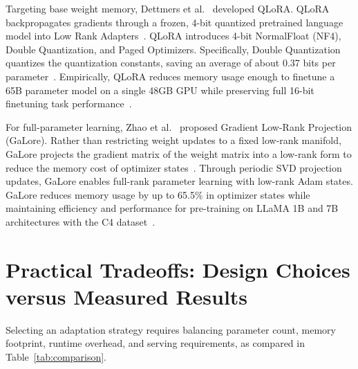 \documentclass[11pt,a4paper]{article}
\begin{document}
Targeting base weight memory, Dettmers et al.~\cite{dettmers2023qlora} developed QLoRA. QLoRA backpropagates gradients through a frozen, 4-bit quantized pretrained language model into Low Rank Adapters~\cite{dettmers2023qlora}. QLoRA introduces 4-bit NormalFloat (NF4), Double Quantization, and Paged Optimizers. Specifically, Double Quantization quantizes the quantization constants, saving an average of about 0.37 bits per parameter~\cite{dettmers2023qlora}. Empirically, QLoRA reduces memory usage enough to finetune a 65B parameter model on a single 48GB GPU while preserving full 16-bit finetuning task performance~\cite{dettmers2023qlora}.

For full-parameter learning, Zhao et al.~\cite{zhao2024galore} proposed Gradient Low-Rank Projection (GaLore). Rather than restricting weight updates to a fixed low-rank manifold, GaLore projects the gradient matrix of the weight matrix into a low-rank form to reduce the memory cost of optimizer states~\cite{zhao2024galore}. Through periodic SVD projection updates, GaLore enables full-rank parameter learning with low-rank Adam states. GaLore reduces memory usage by up to 65.5\% in optimizer states while maintaining efficiency and performance for pre-training on LLaMA 1B and 7B architectures with the C4 dataset~\cite{zhao2024galore}.

\section{Practical Tradeoffs: Design Choices versus Measured Results}

Selecting an adaptation strategy requires balancing parameter count, memory footprint, runtime overhead, and serving requirements, as compared in Table~\ref{tab:comparison}.
\end{document}
